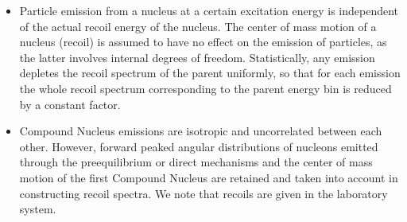 \begin{itemize}
\item Particle emission from a nucleus at a certain excitation energy is
independent of the actual recoil energy of the nucleus. The center of mass
motion of a nucleus (recoil) is assumed to have no effect on the emission of
particles, as the latter involves internal degrees of freedom.
Statistically, any emission depletes the recoil spectrum of the parent
uniformly, so that for each emission the whole recoil spectrum corresponding
to the parent energy bin is reduced by a constant factor.

\item Compound Nucleus emissions are isotropic and uncorrelated between each
other. However, forward peaked angular distributions of nucleons emitted
through the preequilibrium or direct mechanisms and the center of mass
motion of the first Compound Nucleus are retained and taken into account in
constructing recoil spectra. We note that recoils are given in the
laboratory system.
\end{itemize}


